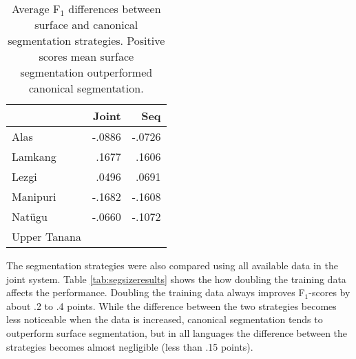 \begin{table}
    \centering
    \begin{tabular}{l|r|r}
          & \textbf{Joint} & \textbf{Seq} \\
         \hline
         Alas  & -.0886 &  -.0726  \\
         \hline
         Lamkang  & .1677 & .1606  \\
         \hline
         Lezgi  & .0496 & .0691  \\
         \hline
         Manipuri  & -.1682 & -.1608   \\
         \hline
         Natügu  & -.0660 & -.1072  \\
         \hline
         Upper Tanana &  &  \\
    \end{tabular}
    \caption[F$_1$-score Differences between Surface and Canonical Segmentation]{Average F$_1$ differences between surface and canonical segmentation strategies. Positive scores mean surface segmentation outperformed canonical segmentation.}
    \label{tab:segdiffresults}
\end{table}


The segmentation strategies were also compared using all available data in the joint system. Table \ref{tab:segsizeresults} shows the how doubling the training data affects the performance. Doubling the training data always improves F$_1$-scores by about .2 to .4 points. While the difference between the two strategies becomes less noticeable when the data is increased, canonical segmentation tends to outperform surface segmentation, but in all languages the difference between the strategies becomes almost negligible (less than .15 points). 

